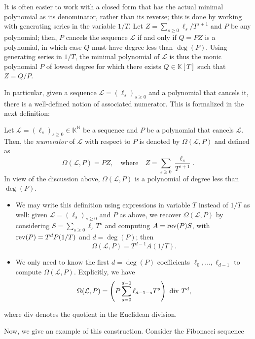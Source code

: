 \documentclass[12pt]{article}
\newcommand{\genseries}{Z}
\newcommand{\minpoly}{P}
\def\N {\ensuremath{\mathbb{N}}}
\def\K{\mathbb{K}}
\def\K {\ensuremath{\mathbb{K}}}
\begin{document}
It is often easier to work with a closed form that has the actual
minimal polynomial as its denominator, rather than its reverse; this
is done by working with generating series in the variable $1/T$.  Let
$\genseries = \sum_{s\ge0} \ell_s / T^{s+1}$ and $\minpoly$
be any polynomial; then, $\minpoly$ cancels the sequence $\mathcal{L}$
if and only if $Q=\minpoly \genseries $ is a polynomial, in which case $Q$
must have degree less than $\deg(\minpoly)$.  Using generating series in
$1/T$, the minimal polynomial of $\mathcal{L}$ is thus the
monic polynomial $\minpoly$ of lowest degree for which there exists $Q \in
\K[T]$ such that $\genseries=Q/\minpoly$.

In particular, given a sequence $\mathcal{L}=(\ell_s)_{s \ge 0}$ and a
polynomial that cancels it, there is a well-defined notion of
associated numerator.  This is formalized in the next definition:
\begin{definition}
  \label{def:omega}
  Let $\mathcal{L}=(\ell_s)_{s \ge 0}\in \K^\N$ be a sequence and $P$ be a
  polynomial that cancels $\mathcal{L}$. Then, the {\em numerator} of $\mathcal{L}$
  with respect to $P$ is denoted by $\Omega(\mathcal{L},P)$ and defined as 
  \[
    \Omega(\mathcal{L},P) = P \genseries, \quad\text{where}\quad
    \genseries=\sum_{s \ge 0} \frac {\ell_s}{T^{s+1}}.
  \]
  In view of the discussion above, $\Omega(\mathcal{L},P)$ is a polynomial of
  degree less than $\deg(P)$.
\end{definition}
\begin{remark} \leavevmode
  \begin{itemize}
  \item We may write this definition using expressions in
    variable $T$ instead of $1/T$ as well: given
    $\mathcal{L}=(\ell_s)_{s\ge0}$ and $P$ as above, we recover
    $\Omega(\mathcal{L},P)$ by considering $S=\sum_{s\ge 0} \ell_s
    T^s$ and computing $A = {\rm rev}(P) S$, with ${\rm rev}(P)=T^d
    P(1/T)$ and $d=\deg(P)$; then
    $$\Omega(\mathcal{L} ,P) = T^{d - 1} A (1/T).$$ 
\item We only need to know the first $d=\deg(P)$ coefficients
  $\ell_0,\dots,\ell_{d-1}$ to compute $\Omega(\mathcal{L}, P)$. Explicitly, we
  have
  \[
    \Omega(\mathcal{L},P) = \left( P \sum_{s=0}^{d-1} \ell_{d - 1- s} T^s \right) {\rm~div~} T^d,
  \]
 \end{itemize}
where div denotes the quotient in the Euclidean division.
\end{remark}
Now, we give an example of this construction. Consider the Fibonacci sequence
\end{document}
